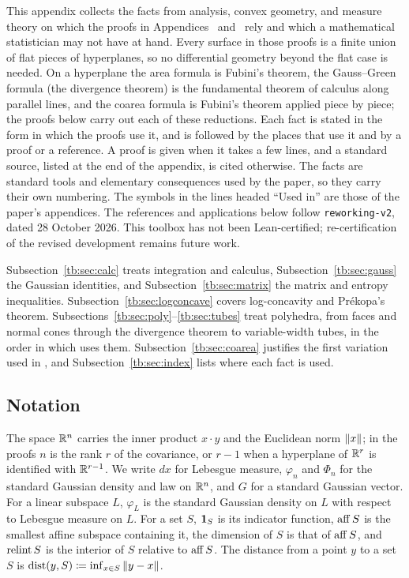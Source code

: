 \documentclass[11pt,letterpaper]{article}
\theoremstyle{plain}
\begin{document}
This appendix collects the facts from analysis, convex geometry, and
measure theory on which the proofs in Appendices~
and~ rely and which a mathematical statistician may
not have at hand. Every surface in those proofs is a finite union of flat
pieces of hyperplanes, so no differential geometry beyond the flat case is
needed. On a hyperplane the area formula is Fubini's theorem, the
Gauss--Green formula (the divergence theorem) is the fundamental theorem of
calculus along parallel lines, and the coarea formula is Fubini's theorem
applied piece by piece; the proofs below carry out each of these
reductions. Each fact is stated in the form in which
the proofs use it, and is followed by the places that use it and by a proof
or a reference. A proof is given when it takes a few lines, and a standard
source, listed at the end of the appendix, is cited otherwise. The facts are
standard tools and elementary consequences used by the paper, so they
carry their own numbering. The symbols in the lines headed ``Used in'' are those of the
paper's appendices. The references and applications below follow
\texttt{reworking-v2}, dated 28 October 2026. This toolbox has not been
Lean-certified; re-certification of the revised development remains
future work.

Subsection~\ref{tb:sec:calc} treats integration and calculus,
Subsection~\ref{tb:sec:gauss} the Gaussian identities, and
Subsection~\ref{tb:sec:matrix} the matrix and entropy inequalities.
Subsection~\ref{tb:sec:logconcave} covers log-concavity and
Pr\'ekopa's theorem. Subsections~\ref{tb:sec:poly}--\ref{tb:sec:tubes}
treat polyhedra, from faces and normal cones through the divergence
theorem to variable-width tubes, in the order in which
 uses them.
Subsection~\ref{tb:sec:coarea} justifies the first variation used
in , and
Subsection~\ref{tb:sec:index} lists where each fact is used.

\subsection{Notation}\label{tb:sec:notation}

The space \(\mathbb R^n\) carries the inner product \(x\cdot y\) and the Euclidean
norm \(\left\lVert x\right\rVert\); in the proofs \(n\) is the rank \(r\) of the covariance,
or \(r-1\) when a hyperplane of \(\mathbb R^r\) is identified with
\(\mathbb R^{r-1}\). We write \(dx\) for Lebesgue measure, \(\varphi_n\) and
\(\Phi_n\) for the standard Gaussian density and law on \(\mathbb R^n\), and \(G\)
for a standard Gaussian vector. For a linear subspace \(L\), \(\varphi_L\)
is the standard Gaussian density on \(L\) with respect to Lebesgue measure
on \(L\). For a set \(S\), \(\mathbf 1_S\) is its indicator function, \(\operatorname{aff} S\)
is the smallest affine subspace containing it, the dimension of \(S\) is
that of \(\operatorname{aff} S\), and \(\operatorname{relint} S\) is the interior of \(S\) relative to
\(\operatorname{aff} S\). The distance from a point \(y\) to a set \(S\) is
\(\operatorname{dist}(y,S)\coloneqq \inf_{x\in S}\left\lVert y-x\right\rVert\).
\end{document}
